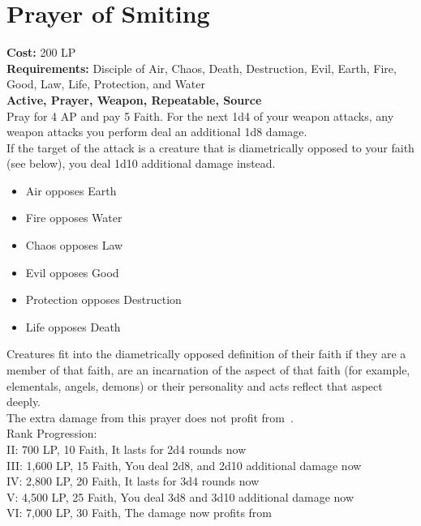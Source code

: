 \section{Prayer of Smiting}\label{prayer:smiting}
\textbf{Cost:} 200 LP\\
\textbf{Requirements:} Disciple of Air, Chaos, Death, Destruction, Evil, Earth, Fire, Good, Law, Life, Protection, and Water\\
\textbf{Active, Prayer, Weapon, Repeatable, Source}\\
Pray for 4 AP and pay 5 Faith.
For the next 1d4 of your weapon attacks, any weapon attacks you perform deal an additional 1d8 damage.\\
If the target of the attack is a creature that is diametrically opposed to your faith (see below), you deal 1d10 additional damage instead.\\
\begin{itemize}
    \item Air opposes Earth
    \item Fire opposes Water
    \item Chaos opposes Law
    \item Evil opposes Good
    \item Protection opposes Destruction
    \item Life opposes Death
\end{itemize}
Creatures fit into the diametrically opposed definition of their faith if they are a member of that faith, are an incarnation of the aspect of that faith (for example, elementals, angels, demons) or their personality and acts reflect that aspect deeply.\\
The extra damage from this prayer does not profit from~.
\\
Rank Progression:\\
II: 700 LP, 10 Faith, It lasts for 2d4 rounds now\\
III: 1,600 LP, 15 Faith, You deal 2d8, and 2d10 additional damage now\\
IV: 2,800 LP, 20 Faith, It lasts for 3d4 rounds now\\
V: 4,500 LP, 25 Faith, You deal 3d8 and 3d10 additional damage now\\
VI: 7,000 LP, 30 Faith, The damage now profits from ~\\